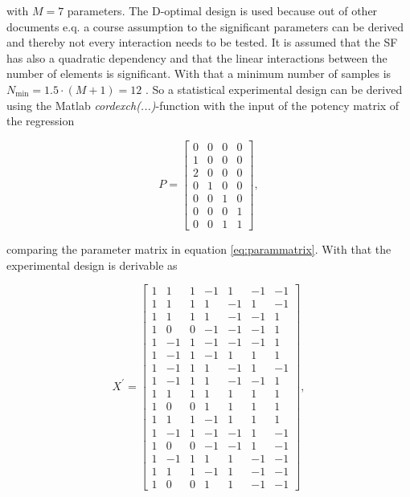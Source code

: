 with $M=7$ parameters. The D-optimal design is used because out of other documents e.q. \cite{2018arXiv180310993F} a course assumption to the significant parameters can be derived and thereby not every interaction needs to be tested. It is assumed that the \ac{SF} has also a quadratic dependency and that the linear interactions between the number of elements is significant. With that a minimum number of samples is $N_\text{min}=1.5\cdot\left(M+1\right)=12$ \cite{dffs}. So a statistical experimental design can be derived using the Matlab\texttrademark{} \textit{cordexch(...)}-function with the input of the potency matrix of the regression

\begin{equation}
P = \begin{bmatrix}
0 & 0 & 0 & 0\\
1 & 0 & 0 & 0\\
2 & 0 & 0 & 0\\
0 & 1 & 0 & 0\\
0 & 0 & 1 & 0\\
0 & 0 & 0 & 1\\
0 & 0 & 1 & 1
\end{bmatrix},
\end{equation}

comparing the parameter matrix in equation \ref{eq:parammatrix}. With that the experimental design is derivable as 

\begin{equation}
X^\prime = \begin{bmatrix}
1&1&1&-1&1&-1&-1\\
1&1&1&1&-1&1&-1\\
1&1&1&1&-1&-1&1\\
1&0&0&-1&-1&-1&1\\
1&-1&1&-1&-1&-1&1\\
1&-1&1&-1&1&1&1\\
1&-1&1&1&-1&1&-1\\
1&-1&1&1&-1&-1&1\\
1&1&1&1&1&1&1\\
1&0&0&1&1&1&1\\
1&1&1&-1&1&1&1\\
1&-1&1&-1&-1&1&-1\\
1&0&0&-1&-1&1&-1\\
1&-1&1&1&1&-1&-1\\
1&1&1&-1&1&-1&-1\\
1&0&0&1&1&-1&-1
\end{bmatrix},
\end{equation}

